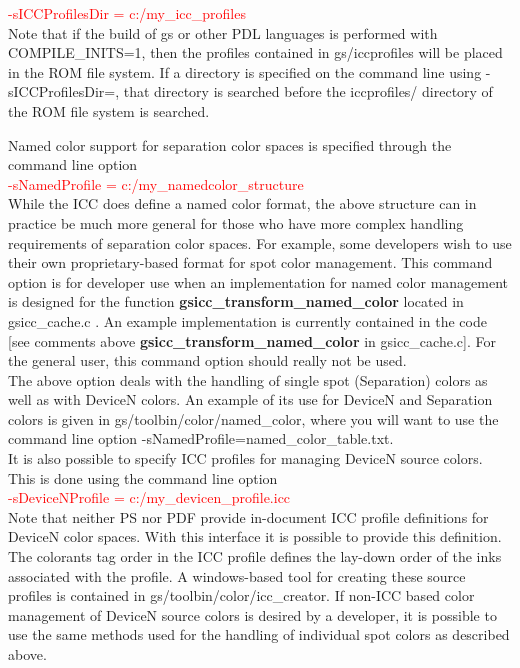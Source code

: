 \documentclass[12pt,notitlepage]{article}
\begin{document}
\textcolor{red}{-sICCProfilesDir = c:/my\_icc\_profiles}\\

 \noindent Note that if the build of gs or other PDL languages is performed with COMPILE\_INITS=1, then the profiles contained in gs/iccprofiles will be placed in the ROM file system. If a directory is specified on the command line using -sICCProfilesDir=, that directory is searched before the iccprofiles/ directory of the ROM file system is searched.

Named color support for separation color spaces is specified through the command line option\\

\textcolor{red}{-sNamedProfile = c:/my\_namedcolor\_structure}\\

 \noindent While the ICC does define a named color format, the above structure can in practice be much more general for those who have more complex handling requirements of separation color spaces. For example, some developers wish to use their own proprietary-based format for spot color management. This command option is for developer use when an implementation for named color management is designed for the function {\bf gsicc\_transform\_named\_color} located in gsicc\_cache.c . An example implementation is currently contained in the code [see comments above {\bf gsicc\_transform\_named\_color} in gsicc\_cache.c]. For the general user, this command option should really not be used.\\

The above option deals with the handling of single spot (Separation) colors as well as with DeviceN colors.  An example of its use for DeviceN and Separation colors is given in gs/toolbin/color/named\_color, where you will want to use the command line option -sNamedProfile=named\_color\_table.txt.\\

 It is also possible to specify ICC profiles for managing DeviceN source colors. This is done using the command line option\\

\textcolor{red}{-sDeviceNProfile = c:/my\_devicen\_profile.icc}\\

 \noindent Note that neither PS nor PDF provide in-document ICC profile definitions for DeviceN color spaces. With this interface it is possible to provide this definition. The colorants tag order in the ICC profile defines the lay-down order of the inks associated with the profile. A windows-based tool for creating these source profiles is contained in gs/toolbin/color/icc\_creator.  If non-ICC based color management of DeviceN source colors is desired by a developer, it is possible to use the same methods used for the handling of individual spot colors as described above.\\
\end{document}
